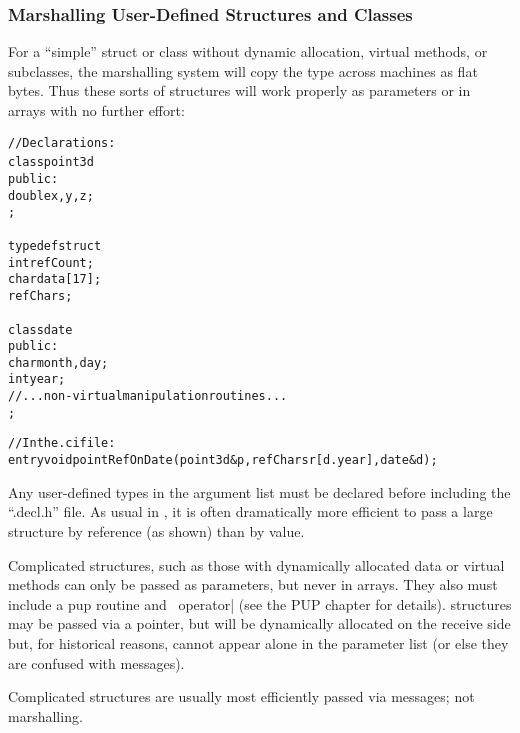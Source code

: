 \subsubsection{Marshalling User-Defined Structures and Classes}

For a ``simple'' struct or class without dynamic allocation,
virtual methods, or subclasses, the marshalling system will
copy the type across machines as flat bytes.  Thus these sorts
of structures will work properly as parameters or in arrays
with no further effort:

\begin{alltt}
//Declarations:
class point3d {
public:
    double x,y,z;    
};

typedef struct {
    int refCount;
    char data[17];
} refChars;

class date {
public:
    char month,day;
    int year;
    //...non-virtual manipulation routines...
};

//In the .ci file:
    entry void pointRefOnDate(point3d &p,refChars r[d.year],date &d);
\end{alltt}

Any user-defined types in the argument list must be declared 
before including the ``.decl.h'' file.
As usual in \CC, it is often dramatically more efficient to pass
a large structure by reference (as shown) than by value.

Complicated structures, such as those with dynamically
allocated data or virtual methods can only be passed as
parameters, but never in arrays.  They also must include a pup
routine and \CC\ operator| (see the PUP chapter for details).
 structures may be passed via a pointer,
but will be dynamically allocated on the receive side
but, for historical reasons, cannot appear alone in the
parameter list (or else they are confused with messages).

Complicated structures are usually most efficiently passed 
via messages; not marshalling.
